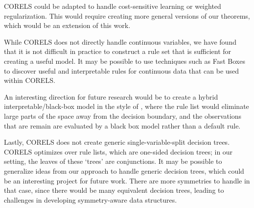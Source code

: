 \begin{arxiv}
CORELS could be adapted to handle cost-sensitive learning or weighted regularization.
%
This would require creating more general versions of our theorems,
which would be an extension of this work. 
%

While CORELS does not directly handle continuous variables, we have found that it is not difficult in practice to construct a rule set that is sufficient for creating a useful model. It may be possible to use techniques such as Fast Boxes \citep{GohRu14} to discover useful and interpretable rules for continuous data that can be used within CORELS.

An interesting direction for future research would be to create a hybrid interpretable/black-box model in the style of \citet{Wang2018}, where the rule list would eliminate large parts of the space away from the decision boundary, and the observations that are remain are evaluated by a black box model rather than a default rule.


Lastly, CORELS does not create generic single-variable-split decision trees.
%
CORELS optimizes over rule lists, which are one-sided decision trees;
in our setting, the leaves of these `trees' are conjunctions.
%
It may be possible to generalize ideas from our approach to handle generic
decision trees, which could be an interesting project for future work. There are more symmetries to handle in that case, since there would be many equivalent decision trees, leading to challenges in developing symmetry-aware data structures.

\end{arxiv}
